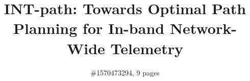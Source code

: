 \documentclass[10pt, conference, letterpaper]{IEEEtran}
\begin{document}
\long{}

\newcommand{\tabincell}[2]{\begin{tabular}{@{}#1@{}}#2\end{tabular}}
\newcommand{\eg}{{\it e.g.}}
\newcommand{\aka}{{\it a.k.a.}}
\newcommand{\etal}{{\it et al.}}
\newcommand{\etc}{{\it etc}}
\newcommand{\ie}{{\it i.e.}}

\title{INT-path: Towards Optimal Path Planning for In-band
Network-Wide Telemetry}

\author{\#1570473294, 9 pages}

\maketitle















\small


\normalsize
\end{document}
